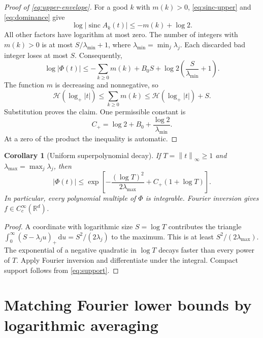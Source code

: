\documentclass[11pt,a4paper]{article}
\numberwithin{equation}{section}
\newtheorem{corollary}[theorem]{Corollary}
\theoremstyle{definition}
\theoremstyle{remark}\newtheorem{remark}[theorem]{Remark}
\newcommand{\R}{\mathbb R}\newcommand{\N}{\mathbb N}
\newcommand{\dd}{\,\mathrm d}
\newcommand{\sinc}{\operatorname{sinc}}
\newcommand{\He}{\mathcal H}
\newcommand{\lp}{\log_+}
\newcommand{\norm}[1]{\left\lVert #1\right\rVert}
\begin{document}
\begin{proof}[Proof of \eqref{eq:upper-envelope}]
For a good $k$ with $m(k)>0$, \eqref{eq:sinc-upper} and
\eqref{eq:dominance} give
\[
 \log|\sinc A_k(t)|\le-m(k)+\log2.
\]
All other factors have logarithm at most zero. The number of integers with
$m(k)>0$ is at most $S/\lambda_{\min}+1$, where
$\lambda_{\min}=\min_j\lambda_j$. Each discarded bad integer loses at most
$S$. Consequently,
\begin{equation}
 \log|\Phi(t)|\le-\sum_{k\ge0}m(k)+B_0S+
                 \log2\left(\frac S{\lambda_{\min}}+1\right).
 \label{eq:sumupper}
\end{equation}
The function $m$ is decreasing and nonnegative, so
\begin{equation}
 \He(\lp|t|)\le\sum_{k\ge0}m(k)
     \le\He(\lp|t|)+S.
 \label{eq:sum-integral}
\end{equation}
Substitution proves the claim. One permissible constant is
\begin{equation}
 C_+=\log2+B_0+\frac{\log2}{\lambda_{\min}}.
 \label{eq:Cplus}
\end{equation}
At a zero of the product the inequality is automatic.
\end{proof}

\begin{corollary}[Uniform superpolynomial decay]
\label{cor:schwartz}
If $T=\norm t_\infty\ge1$ and $\lambda_{\max}=\max_j\lambda_j$, then
\begin{equation}
 |\Phi(t)|\le
 \exp\left[-\frac{(\log T)^2}{2\lambda_{\max}}+C_+(1+\log T)\right].
 \label{eq:radialupper}
\end{equation}
In particular, every polynomial multiple of $\Phi$ is integrable. Fourier
inversion gives $f\in C_c^\infty(\R^d)$.
\end{corollary}
\begin{proof}
A coordinate with logarithmic size $S=\log T$ contributes the triangle
$\int_0^\infty(S-\lambda_ju)_+\dd u=S^2/(2\lambda_j)$ to the maximum.
This is at least $S^2/(2\lambda_{\max})$. The exponential of a negative
quadratic in $\log T$ decays faster than every power of $T$. Apply Fourier
inversion and differentiate under the integral. Compact support follows
from \eqref{eq:support}.
\end{proof}

\section{Matching Fourier lower bounds by logarithmic averaging}
\label{sec:lower}
\end{document}
